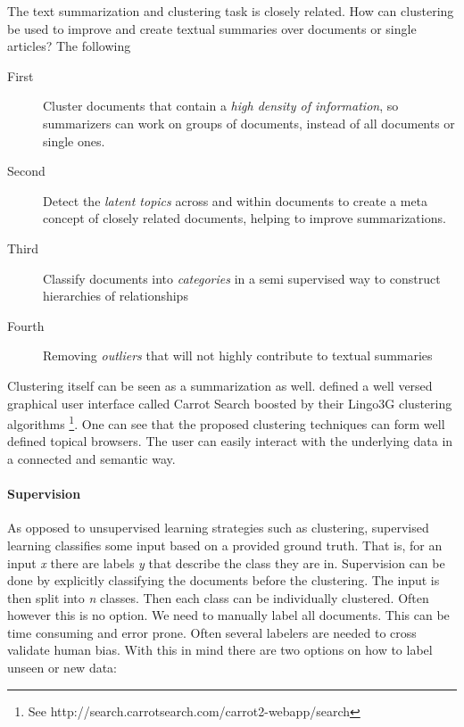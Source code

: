   The text summarization and clustering task is closely related. How can clustering be used to improve and create textual summaries over documents or single articles? The following 
  
  \begin{description}
    \item[First] Cluster documents that contain a \emph{high density of information}, so summarizers can work on groups of documents, instead of all documents or single ones.
    \item[Second] Detect the \emph{latent topics} across and within documents to create a meta concept of closely related documents, helping to improve summarizations.
    \item[Third] Classify documents into \emph{categories} in a semi supervised way to construct hierarchies of relationships
    \item[Fourth] Removing \emph{outliers} that will not highly contribute to textual summaries
  \end{description}

  Clustering itself can be seen as a summarization as well. \cite{Carrot2Search2003} defined a well versed graphical user interface called Carrot Search boosted by their Lingo3G clustering algorithms \footnote{See http://search.carrotsearch.com/carrot2-webapp/search}. One can see that the proposed clustering techniques can form well defined topical browsers. The user can easily interact with the underlying data in a connected and semantic way.

  \paragraph{Supervision}
    As opposed to unsupervised learning strategies such as clustering, supervised learning classifies some input based on a provided ground truth. That is, for an input \emph{x} there are labels \emph{y} that describe the class they are in. Supervision can be done by explicitly classifying the documents before the clustering. The input is then split into \emph{n} classes. Then each class can be individually clustered. Often however this is no option. We need to manually label all documents. This can be time consuming and error prone. Often several labelers are needed to cross validate human bias.
    With this in mind there are two options on how to label unseen or new data:

